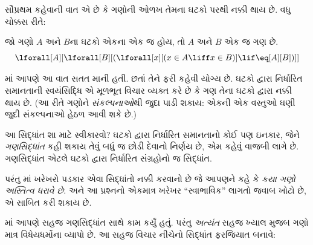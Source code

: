
\label{guunit:OLP-0529}


\begingroup
\makeatletter{}\makeatother

\label{guunit:OLP-0530}


\begingroup
\makeatletter{}\makeatother

\label{guunit:OLP-0531}


સૌપ્રથમ કહેવાની વાત એ છે કે ગણોની ઓળખ તેમના ઘટકો પરથી
નક્કી થાય છે. વધુ ચોક્કસ રીતે:

\begin{axiom}[ઘટકો દ્વારા નિર્ધારિત સમાનતા]
જો ગણો $A$ અને $B$ના ઘટકો એકના એક જ હોય, તો $A$ અને $B$
એક જ ગણ છે.
\[
  \lforall[A][\lforall[B][(\lforall[x][(x \in A \liff x \in B)] \lif
  \eq[A][B])]]
\]
\end{axiom}

માં આપણે આ વાત સતત માની હતી. છતાં તેને ફરી
કહેવી યોગ્ય છે. ઘટકો દ્વારા નિર્ધારિત સમાનતાની સ્વયંસિદ્ધિ એ
મૂળભૂત વિચાર વ્યક્ત કરે છે કે ગણ તેના ઘટકો દ્વારા નક્કી
થાય છે. (આ રીતે ગણોને \emph{સંકલ્પનાઓ}થી જુદા પાડી શકાય: એકની એક
વસ્તુઓ ઘણી જુદી સંકલ્પનાઓ હેઠળ આવી શકે છે.)

આ સિદ્ધાંત શા માટે સ્વીકારવો? ઘટકો દ્વારા નિર્ધારિત સમાનતાનો કોઈ પણ
ઇનકાર, જેને \emph{ગણસિદ્ધાંત} કહી શકાય તેવું બધું જ છોડી દેવાનો
નિર્ણય છે, એમ કહેવું વાજબી લાગે છે. ગણસિદ્ધાંત એટલે ઘટકો દ્વારા
નિર્ધારિત સંગ્રહોનો જ સિદ્ધાંત.

પરંતુ માં ખરેખરો પડકાર એવા સિદ્ધાંતો નક્કી
કરવાનો છે જે આપણને કહે કે \emph{કયા ગણો અસ્તિત્વ ધરાવે છે}. અને
આ પ્રશ્નનો એકમાત્ર ખરેખર ``સ્વાભાવિક'' લાગતો જવાબ ખોટો છે, એ
સાબિત કરી શકાય છે.
\endgroup

\begingroup
\makeatletter{}\makeatother

\label{guunit:OLP-0532}


માં આપણે સહજ ગણસિદ્ધાંત સાથે કામ કર્યું હતું.
પરંતુ \emph{અત્યંત} સહજ ખ્યાલ મુજબ ગણો માત્ર વિધેયધર્મોના વ્યાપો છે.
આ સહજ વિચાર નીચેનો સિદ્ધાંત ફરજિયાત બનાવે:

